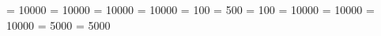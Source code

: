 \clubpenalty = 10000 %
\widowpenalty = 10000 %
\displaywidowpenalty = 10000 %
\finalhyphendemerits = 10000 %
\linepenalty = 100 %
\exhyphenpenalty = 500 %
\brokenpenalty = 100 %
\doublehyphendemerits = 10000 %
\adjdemerits = 10000 %
\interdisplaylinepenalty = 10000 %
\predisplaypenalty = 5000 %
\postdisplaypenalty = 5000 %